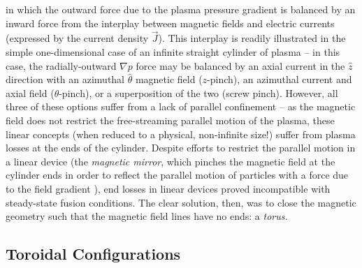 \noindent in which the outward force due to the plasma pressure gradient is balanced by an inward force from the interplay between magnetic fields and electric currents (expressed by the current density $\vec{J}$).  This interplay is readily illustrated in the simple one-dimensional case of an infinite straight cylinder of plasma -- in this case, the radially-outward $\nabla p$ force may be balanced by an axial current in the $\hat{z}$ direction with an azimuthal $\hat{\theta}$ magnetic field ($z$-pinch), an azimuthal current and axial field ($\theta$-pinch), or a superposition of the two (screw pinch).  However, all three of these options suffer from a lack of parallel confinement -- as the magnetic field does not restrict the free-streaming parallel motion of the plasma, these linear concepts (when reduced to a physical, non-infinite size!) suffer from plasma losses at the ends of the cylinder.  Despite efforts to restrict the parallel motion in a linear device (\eg the \emph{magnetic mirror}, which 
pinches the magnetic field at the cylinder ends in order to reflect the parallel motion of particles with a force due to the field gradient \cite{Kesner1982}), end losses in linear devices proved incompatible with steady-state fusion conditions.  The clear solution, then, was to close the magnetic geometry such that the magnetic field lines have no ends: a \emph{torus.}

\subsection{Toroidal Configurations}\label{subsec:intro_toroidal}

